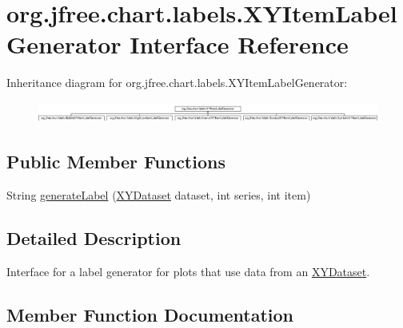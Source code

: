 \hypertarget{interfaceorg_1_1jfree_1_1chart_1_1labels_1_1_x_y_item_label_generator}{}\section{org.\+jfree.\+chart.\+labels.\+X\+Y\+Item\+Label\+Generator Interface Reference}
\label{interfaceorg_1_1jfree_1_1chart_1_1labels_1_1_x_y_item_label_generator}
Inheritance diagram for org.\+jfree.\+chart.\+labels.\+X\+Y\+Item\+Label\+Generator\+:\begin{figure}[H]
\begin{center}
\leavevmode
\includegraphics[height=0.695652cm]{interfaceorg_1_1jfree_1_1chart_1_1labels_1_1_x_y_item_label_generator}
\end{center}
\end{figure}
\subsection*{Public Member Functions}
\begin{DoxyCompactItemize}
\item 
String \mbox{\hyperlink{interfaceorg_1_1jfree_1_1chart_1_1labels_1_1_x_y_item_label_generator_aced931506ef5a2a355b8846534ad457e}{generate\+Label}} (\mbox{\hyperlink{interfaceorg_1_1jfree_1_1data_1_1xy_1_1_x_y_dataset}{X\+Y\+Dataset}} dataset, int series, int item)
\end{DoxyCompactItemize}


\subsection{Detailed Description}
Interface for a label generator for plots that use data from an \mbox{\hyperlink{}{X\+Y\+Dataset}}. 

\subsection{Member Function Documentation}
\mbox{\label{interfaceorg_1_1jfree_1_1chart_1_1labels_1_1_x_y_item_label_generator_aced931506ef5a2a355b8846534ad457e}} 
